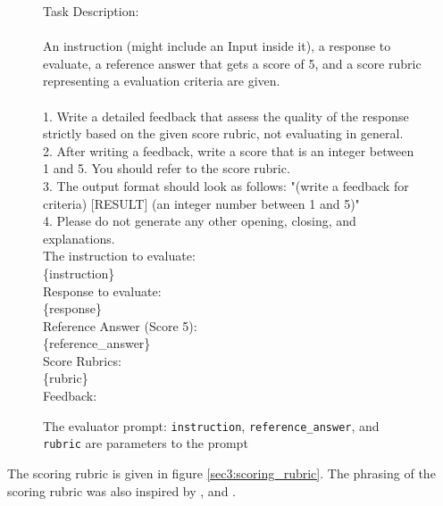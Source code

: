 \documentclass{article}
\begin{document}
\begin{figure}
\begin{mdframed}[linecolor=blue, backgroundcolor=lightgray]
Task Description: \\ \\
An instruction (might include an Input inside it), a response to evaluate, a reference answer that gets a score of 5, and a score rubric representing a evaluation criteria are given. \\ \\
1. Write a detailed feedback that assess the quality of the response strictly based on the given score rubric, not evaluating in general. \\
2. After writing a feedback, write a score that is an integer between 1 and 5. You should refer to the score rubric. \\
3. The output format should look as follows: "(write a feedback for criteria) [RESULT] (an integer number between 1 and 5)" \\
4. Please do not generate any other opening, closing, and explanations. \\

The instruction to evaluate: \\
\{instruction\} \\

Response to evaluate: \\
\{response\} \\

Reference Answer (Score 5): \\
\{reference\_answer\} \\

Score Rubrics: \\
\{rubric\} \\

Feedback: \\ 
\end{mdframed}
\caption{The evaluator prompt: \texttt{instruction}, \texttt{reference\_answer}, and \texttt{rubric} are parameters to the prompt}
\label{sec3:eval_AUT_prompt}
\end{figure}

The scoring rubric is given in figure \ref{sec3:scoring_rubric}. The phrasing of the scoring rubric was also inspired by \cite{zhao2024assessing}, and \cite{zhao2024assessingunderstandingcreativitylarge}.
\end{document}
